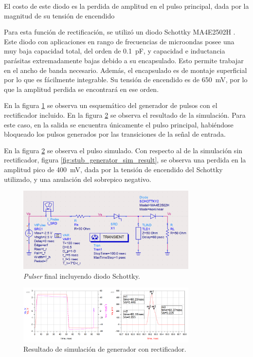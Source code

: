 El costo de este diodo es la perdida de amplitud en el pulso principal, dada por
la magnitud de su tensión de encendido

Para esta función de rectificación, se utilizó un diodo Schottky MA4E2502H
\cite{MA4E2502H-datasheet}. Este diodo con aplicaciones en rango de frecuencias
de microondas posee una muy baja capacidad total, del orden de
\qty{0.1}{\pico\farad}, y capacidad e inductancia parásitas extremadamente bajas
debido a su encapsulado. Esto permite trabajar en el ancho de banda necesario.
Además, el encapsulado es de montaje superficial por lo que es fácilmente
integrable. Su tensión de encendido es de \qty{650}{\milli\volt}, por lo que la
amplitud perdida se encontrará en ese orden.

En la figura \ref{fig:pulser_w_schottky_sch} se observa un esquemático del
generador de pulsos con el rectificador incluido. En la figura
\ref{fig:pulser_w_schottky_sim_result} se observa el resultado de la
simulación. Para este caso, en la salida se encuentra únicamente el pulso
principal, habiéndose bloqueado los pulsos generados por las transiciones de la
señal de entrada.

En la figura \ref{fig:pulser_w_schottky_sim_result} se observa el pulso
simulado. Con respecto al de la simulación sin rectificador, figura
\ref{fig:stub_generator_sim_result}, se observa una perdida en la amplitud pico de
\qty{400}{\milli\volt}, dada por la tensión de encendido del Schottky
utilizado, y una anulación del sobrepico negativo.

\begin{figure}[t!]
    \centering
    \includegraphics[width=0.8\textwidth]{images/pulser_w_schottky_sch.png}
    \caption{\textit{Pulser} final incluyendo diodo Schottky.}
    \label{fig:pulser_w_schottky_sch}
\end{figure}

\begin{figure}[t!]
    \centering
    \includegraphics[width=0.8\textwidth]{images/pulser_w_schottky_sim_result.png}
    \caption{Resultado de simulación de generador con rectificador.}
    \label{fig:pulser_w_schottky_sim_result}
\end{figure}


